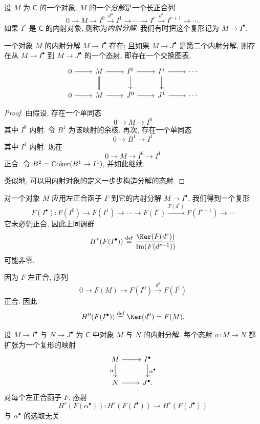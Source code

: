 设 $M$ 为 $\mathsf{C}$ 的一个对象. $M$ 的一个\emph{分解}是一个长正合列
\[
 0\to M\to I^0\xrightarrow{d^0} I^1\to\cdots\to I^r\xrightarrow{d^r} I^{r+1}\to\cdots.
\]
如果 $I^r$ 是 $\mathsf{C}$ 的内射对象, 则称为\emph{内射分解}. 我们有时把这个复形记为 $M\to I^\bullet$.

\begin{lemma}\label{lem:ii.A.6}
一个对象 $M$ 的内射分解 $M\to I^\bullet$ 存在; 且如果 $M\to J^\bullet$ 是第二个内射分解, 则存在从 $M\to I^\bullet$ 到 $M\to J^\bullet$ 的一个态射, 即存在一个交换图表,
\[
 \begin{tikzcd}
 0 \ar[r] & M \ar[r] \ar[d, no head, double] & I^0 \ar[r] \ar[d] & I^1 \ar[r] \ar[d] & \cdots \\
 0 \ar[r] & M \ar[r] & J^0 \ar[r] & J^1 \ar[r] & \cdots
 \end{tikzcd}
\]
\end{lemma}

\begin{proof}
由假设, 存在一个单同态
\[
 0\to M\to I^0
\]
其中 $I^0$ 内射. 令 $B^1$ 为该映射的余核. 再次, 存在一个单同态
\[
 0\to B^1\to I^1
\]
其中 $I^1$ 内射. 现在
\[
 0\to M\to I^0\to I^1
\]
正合. 令 $B^2=\operatorname{Coker}(B^1\to I^1)$, 并如此继续.

类似地, 可以用内射对象的定义一步步构造分解的态射.
\end{proof}

对一个对象 $M$ 应用左正合函子 $F$ 到它的内射分解 $M\to I^\bullet$, 我们得到一个复形
\[
 F(I^\bullet)\colon F(I^0)\to F(I^1)\to\cdots\to F(I^r)\xrightarrow{F(d^r)} F(I^{r+1})\to\cdots
\]
它未必仍正合, 因此上同调群
\[
 H^r(F(I^\bullet))\stackrel{\mathrm{def}}{=}\frac{\Ker(F(d^r))}{\Im(F(d^{r-1}))}
\]
可能非零.

\begin{remark}\label{rem:ii.A.7}
因为 $F$ 左正合, 序列
\[
 0\to F(M)\to F(I^0)\xrightarrow{d^0} F(I^1)
\]
正合. 因此
\[
 H^0(F(I^\bullet))\stackrel{\mathrm{def}}{=}\Ker(d^0)=F(M).
\]
\end{remark}

\begin{proposition}\label{prop:ii.A.8}
设 $M\to I^\bullet$ 与 $N\to J^\bullet$ 为 $\mathsf{C}$ 中对象 $M$ 与 $N$ 的内射分解. 每个态射 $\alpha\colon M\to N$ 都扩张为一个复形的映射
\[
 \begin{tikzcd}
 M \ar[r] \ar[d, "\alpha"'] & I^\bullet \ar[d, "\alpha^\bullet"] \\
 N \ar[r] & J^\bullet.
 \end{tikzcd}
\]
对每个左正合函子 $F$, 态射
\[
 H^r(F(\alpha^\bullet))\colon H^r(F(I^\bullet))\to H^r(F(J^\bullet))
\]
与 $\alpha^\bullet$ 的选取无关.
\end{proposition}


